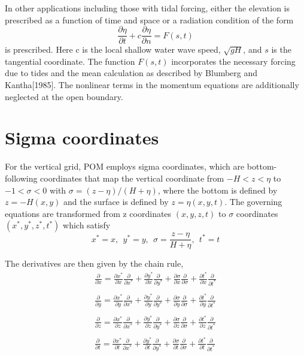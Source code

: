 \documentclass[oribibl]{llncs}
\begin{document}
 In other applications including those with tidal forcing, either the elevation is prescribed as a function of time and space or a radiation condition of the form
 \begin{equation}
 \frac{\partial \eta}{\partial t} + c \frac{\partial \eta}{\partial n}  =F(s,t)
 \end{equation}
 is prescribed. Here c is the local shallow water wave speed, $\sqrt{gH}$, and $s$ is the tangential coordinate. The function $F(s,t)$ incorporates the necessary forcing due to tides and the mean calculation as described by Blumberg and Kantha[1985]. The nonlinear terms in the momentum equations are additionally neglected at the open boundary.



\section{Sigma coordinates}
For the vertical grid, POM employs sigma coordinates, which are bottom-following coordinates that map the vertical coordinate from $-H < z < \eta$ to $-1 < \sigma < 0$ with $\sigma  = (z-\eta)/(H + \eta)$, where the bottom is defined by $z =-H(x, y)$ and the surface is defined by $z = \eta(x, y, t)$. The governing equations are transformed from z coordinates $(x,y,z,t)$ to $\sigma$ coordinates $(x^*,y^*,z^*,t^*)$ which satisfy
\begin{equation}
x^*=x,\ \ y^*=y,\ \ \sigma=\frac{z-\eta}{H+\eta},\ \ t^*=t
\end{equation}

The derivatives are then given by the chain rule,
\begin{eqnarray}
\frac{\partial}{\partial x} = \frac{\partial x^*}{\partial x} \frac{\partial}{\partial x^*} +  \frac{\partial y^*}{\partial x} \frac{\partial}{\partial y^*} +  \frac{\partial \sigma}{\partial x} \frac{\partial}{\partial \sigma} +  \frac{\partial t^*}{\partial x} \frac{\partial}{\partial t^*} \\ \nonumber \\ 
\frac{\partial}{\partial y} = \frac{\partial x^*}{\partial y} \frac{\partial}{\partial x^*} +  \frac{\partial y^*}{\partial y} \frac{\partial}{\partial y^*} +  \frac{\partial \sigma}{\partial y} \frac{\partial}{\partial \sigma} +  \frac{\partial t^*}{\partial y} \frac{\partial}{\partial t^*} \\ \nonumber \\ 
\frac{\partial}{\partial z} = \frac{\partial x^*}{\partial z} \frac{\partial}{\partial x^*} +  \frac{\partial y^*}{\partial z} \frac{\partial}{\partial y^*} +  \frac{\partial \sigma}{\partial z} \frac{\partial}{\partial \sigma} +  \frac{\partial t^*}{\partial z} \frac{\partial}{\partial t^*} \\ \nonumber \\ 
\frac{\partial}{\partial t} = \frac{\partial x^*}{\partial t} \frac{\partial}{\partial x^*} +  \frac{\partial y^*}{\partial t} \frac{\partial}{\partial y^*} +  \frac{\partial \sigma}{\partial t} \frac{\partial}{\partial \sigma} +  \frac{\partial t^*}{\partial t} \frac{\partial}{\partial t^*}
\end{eqnarray}
\end{document}
